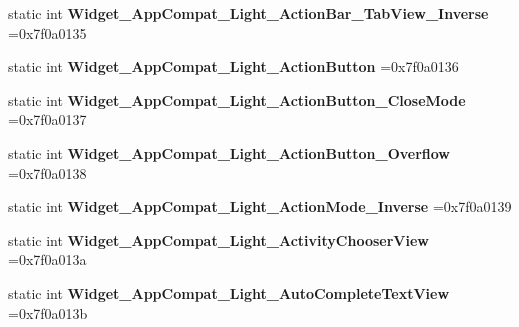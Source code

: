\begin{DoxyCompactItemize}
static int {\bfseries Widget\+\_\+\+App\+Compat\+\_\+\+Light\+\_\+\+Action\+Bar\+\_\+\+Tab\+View\+\_\+\+Inverse} =0x7f0a0135
\item 
\mbox{\label{classandroid_1_1support_1_1v7_1_1recyclerview_1_1R_1_1style_af620263a31430637e30b89caf574e28b}} 
static int {\bfseries Widget\+\_\+\+App\+Compat\+\_\+\+Light\+\_\+\+Action\+Button} =0x7f0a0136
\item 
\mbox{\label{classandroid_1_1support_1_1v7_1_1recyclerview_1_1R_1_1style_af86f18c54de4be2b8d3e175f2fef766f}} 
static int {\bfseries Widget\+\_\+\+App\+Compat\+\_\+\+Light\+\_\+\+Action\+Button\+\_\+\+Close\+Mode} =0x7f0a0137
\item 
\mbox{\label{classandroid_1_1support_1_1v7_1_1recyclerview_1_1R_1_1style_a5b1f39412f36905a65498b9c727c938e}} 
static int {\bfseries Widget\+\_\+\+App\+Compat\+\_\+\+Light\+\_\+\+Action\+Button\+\_\+\+Overflow} =0x7f0a0138
\item 
\mbox{\label{classandroid_1_1support_1_1v7_1_1recyclerview_1_1R_1_1style_acc35f3cf1bd9637af8949cbcb4a5a119}} 
static int {\bfseries Widget\+\_\+\+App\+Compat\+\_\+\+Light\+\_\+\+Action\+Mode\+\_\+\+Inverse} =0x7f0a0139
\item 
\mbox{\label{classandroid_1_1support_1_1v7_1_1recyclerview_1_1R_1_1style_afd477e697e3fbc71b3c1c2b05bfbc41e}} 
static int {\bfseries Widget\+\_\+\+App\+Compat\+\_\+\+Light\+\_\+\+Activity\+Chooser\+View} =0x7f0a013a
\item 
\mbox{\label{classandroid_1_1support_1_1v7_1_1recyclerview_1_1R_1_1style_a7a4eca2a8b6dc9dabbb7fb0199bfd939}} 
static int {\bfseries Widget\+\_\+\+App\+Compat\+\_\+\+Light\+\_\+\+Auto\+Complete\+Text\+View} =0x7f0a013b
\item 
\mbox{\label{classandroid_1_1support_1_1v7_1_1recyclerview_1_1R_1_1style_ac334af885daec8d584b8e3da496ce25e}} 

\end{DoxyCompactItemize}

